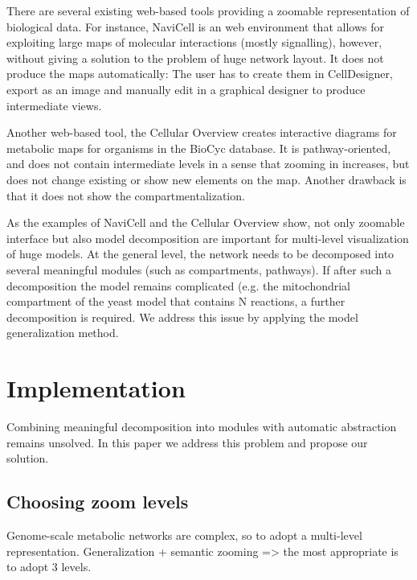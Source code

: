 \documentclass{bmcart}
\begin{document}
There are several existing web-based tools providing a zoomable representation of biological data. For instance, NaviCell\cite{Kuperstein2013} is an web environment that allows for exploiting large maps of molecular interactions (mostly signalling), however, without giving a solution to the problem of huge network layout. It does not produce the maps automatically: The user has to create them in CellDesigner, export as an image and manually edit in a graphical designer to produce intermediate views.

Another web-based tool, the Cellular Overview\cite{Latendresse2011} creates interactive diagrams for metabolic maps for organisms in the BioCyc database\cite{Caspi2012}. It is pathway-oriented, and does not contain intermediate levels in a sense that zooming in increases, but does not change existing or show new elements on the map. Another drawback is that it does not show the compartmentalization.

As the examples of NaviCell and the Cellular Overview show, not only zoomable interface but also model decomposition are important for multi-level visualization of huge models. At the general level, the network needs to be decomposed into several meaningful modules (such as compartments, pathways). If after such a decomposition the model remains complicated (e.g. the mitochondrial compartment of the yeast model\cite{Heavner12} that contains N reactions, a further decomposition is required. We address this issue by applying the model generalization method.


\section*{Implementation}

Combining meaningful decomposition into modules with automatic abstraction remains unsolved. In this paper we address this problem and propose our solution.

\subsection*{Choosing zoom levels}
Genome-scale metabolic networks are complex, so to adopt a multi-level representation. Generalization + semantic zooming => the most appropriate is to adopt 3 levels.
\end{document}
